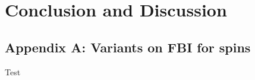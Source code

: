 
\section{Conclusion and Discussion}

\subsection{Appendix A: Variants on FBI for spins}
\label{Appendix:Variants}
Test